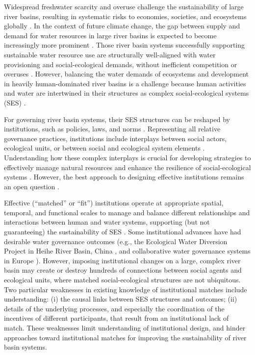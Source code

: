 Widespread freshwater scarcity and overuse challenge the sustainability of large river basins, resulting in systematic risks to economies, societies, and ecosystems globally \cite{distefano2017, dolan2021, xu2020b, mekonnen2016}.
In the context of future climate change, the gap between supply and demand for water resources in large river basins is expected to become increasingly more prominent \cite{florke2018, yoon2021}.
Those river basin systems successfully supporting sustainable water resource use are structurally well-aligned with water provisioning and social-ecological demands, without inefficient competition or overuses \cite{wang2019d}.
However, balancing the water demands of ecosystems and development in heavily human-dominated river basins is a challenge because human activities and water are intertwined in their structures as complex social-ecological systems (SES) \cite{huggins2022,konar2019}.

For governing river basin systems, their SES structures can be reshaped by institutions, such as policies, laws, and norms \cite{young2008,cumming2020b}.
Representing all relative governance practices, institutions include interplays between social actors, ecological units, or between social and ecological system elements
\cite{lien2020, bodin2017b}.
Understanding how these complex interplays is crucial for developing strategies to effectively manage natural resources and enhance the resilience of social-ecological systems \cite{kluger2020}.
However, the best approach to designing effective institutions remains an open question \cite{agrawal2003, persha2011, agrawal2001}.

Effective (``matched'' or ``fit'') institutions operate at appropriate spatial, temporal, and functional scales to manage and balance different relationships and interactions between human and water systems, supporting (but not guaranteeing) the sustainability of SES \cite{epstein2015, wang2019d}.
Some institutional advances have had desirable water governance outcomes (e.g., the Ecological Water Diversion Project in Heihe River Basin, China \cite{wang2019d}, and collaborative water governance systems in Europe \cite{green2013}).
However, imposing institutional changes on a large, complex river basin may create or destroy hundreds of connections between social agents and ecological units, where matched social-ecological structures are not ubiquitous.
Two particular weaknesses in existing knowledge of institutional matches include understanding: (i) the causal links between SES structures and outcomes; (ii) details of the underlying processes, and especially the coordination of the incentives of different participants, that result from an institutional lack of match.
These weaknesses limit understanding of institutional design, and hinder approaches toward institutional matches for improving the sustainability of river basin systems.

